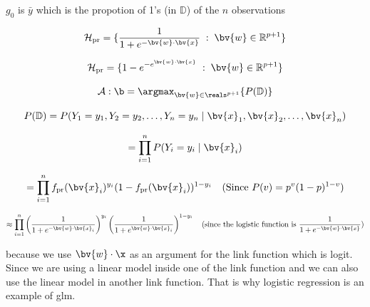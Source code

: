 \documentclass[12pt]{article}
\begin{document}
\begin{enumerate}


$g_0$ is $\bar{y}$ which is the propotion of 1's (in $\mathbb{D}$) of the $n$ observations


\[
\mathcal{H}_{\text{pr}} = \{ \frac{1}{1+e^{-\bv{w} \cdot \bv{x}}} \;:\; \bv{w} \in \mathbb{R}^{p+1}  \}
\]


\[
\mathcal{H}_{\text{pr}} = \{ 1-e^{-e^{\bv{w} \cdot \bv{x}}} \;:\; \bv{w} \in \mathbb{R}^{p+1}  \}
\]


\[
\mathcal{A} : \b = \argmax_{\bv{w} \in \reals^{p+1}} \{ P(\mathbb{D}) \}
\]

\[
P(\mathbb{D}) = P( Y_1 = y_1, Y_2 = y_2, \ldots, Y_n = y_n \;|\; \bv{x}_1, \bv{x}_2, \ldots, \bv{x}_n )
\]

\[
= \prod_{i=1}^{n} P(Y_i = y_i \mid \bv{x}_i)
\]

\[
= \prod_{i=1}^{n} f_{\text{pr}}(\bv{x}_i)^{y_i} (1 - f_{\text{pr}}(\bv{x}_i))^{1 - y_i}
\quad \text{(Since } P(v) = p^v (1 - p)^{1 - v} \text{)}
\]

\[
\approx \prod_{i=1}^{n} \left( \frac{1}{1 + e^{-\bv{w} \cdot \bv{x}_i}} \right)^{y_i}
\left( \frac{1}{1 + e^{\bv{w} \cdot \bv{x}_i}} \right)^{1 - y_i}
\quad \text{(since the logistic function is } \frac{1}{1 + e^{-\bv{w} \cdot \bv{x}}} \text{)}
\]


because we use $\bv{w} \cdot \x$ as an argument for the link function which is logit. Since we are using a linear model inside one of the link function and we can also use the linear model in another link function. That is why logistic regression is an example of glm.


\end{enumerate}
\end{document}
